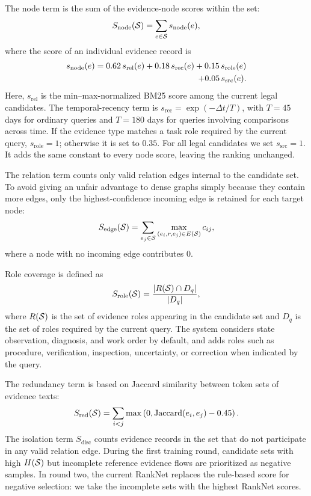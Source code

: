 The node term is the sum of the evidence-node scores within the set:
\begin{equation}
S_{\mathrm{node}}(\mathcal{S})
=
\sum_{e\in\mathcal{S}}s_{\mathrm{node}}(e),
\end{equation}
where the score of an individual evidence record is
\begin{align}
s_{\mathrm{node}}(e)
=
0.62\,s_{\mathrm{rel}}(e)
+0.18\,s_{\mathrm{rec}}(e)
+0.15\,s_{\mathrm{role}}(e) \\
+0.05\,s_{\mathrm{src}}(e). \notag
\end{align}
Here, $s_{\mathrm{rel}}$ is the min--max-normalized BM25 score among the current legal candidates.
The temporal-recency term is $s_{\mathrm{rec}}=\exp(-\Delta t/T)$, with $T=45$ days for ordinary queries and $T=180$ days for queries involving comparisons across time.
If the evidence type matches a task role required by the current query, $s_{\mathrm{role}}=1$; otherwise it is set to $0.35$.
For all legal candidates we set $s_{\mathrm{src}}=1$. It adds the same constant to every node score, leaving the ranking unchanged.

The relation term counts only valid relation edges internal to the candidate set. To avoid giving an unfair advantage to dense graphs simply because they contain more edges, only the highest-confidence incoming edge is retained for each target node:
\begin{equation}
S_{\mathrm{edge}}(\mathcal{S})
=
\sum_{e_j\in\mathcal{S}}
\max_{(e_i,r,e_j)\in E(\mathcal{S})}c_{ij},
\end{equation}
where a node with no incoming edge contributes 0.

Role coverage is defined as
\begin{equation}
S_{\mathrm{role}}(\mathcal{S})
=
\frac{|R(\mathcal{S})\cap D_q|}{|D_q|},
\end{equation}
where $R(\mathcal{S})$ is the set of evidence roles appearing in the candidate set and $D_q$ is the set of roles required by the current query. The system considers state observation, diagnosis, and work order by default, and adds roles such as procedure, verification, inspection, uncertainty, or correction when indicated by the query.

The redundancy term is based on Jaccard similarity between token sets of evidence texts:
\begin{equation}
S_{\mathrm{red}}(\mathcal{S})
=
\sum_{i<j}
\max\left(
0,
\operatorname{Jaccard}(e_i,e_j)-0.45
\right).
\end{equation}
The isolation term $S_{\mathrm{disc}}$ counts evidence records in the set that do not participate in any valid relation edge.
During the first training round, candidate sets with high $H(\mathcal{S})$ but incomplete reference evidence flows are prioritized as negative samples. In round two, the current RankNet replaces the rule-based score for negative selection: we take the incomplete sets with the highest RankNet scores.


